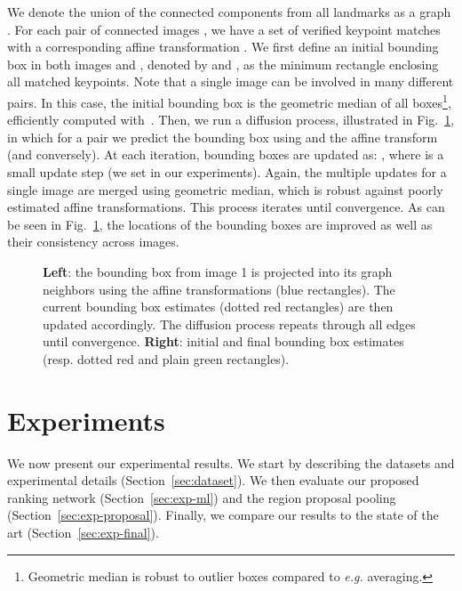 \documentclass[runningheads]{llncs}
\begin{document}
We denote the union of the connected components from all landmarks as a graph .  For each pair of connected images
, we have a set of verified keypoint matches with a corresponding affine
transformation .  We first define an initial bounding box in both images  and , denoted by  and
, as the minimum rectangle enclosing all matched keypoints. Note that a single image can be involved in many
different pairs. In this case, the initial bounding box is the geometric median of all boxes\footnote{Geometric median
is robust to outlier boxes compared to \emph{e.g.} averaging.}, efficiently computed
with~\cite{GeoMedian2004}. Then, we run a diffusion process, illustrated in Fig.~\ref{fig:diffusion}, in which for a
pair  we predict the bounding box  using  and the affine transform  (and conversely).  At
each iteration, bounding boxes are updated as: , where  is a small
update step (we set  in our experiments). Again, the multiple updates for a single image are merged using
geometric median, which is robust against poorly estimated affine transformations.  This process iterates until
convergence. As can be seen in Fig.~\ref{fig:diffusion}, the locations of the bounding boxes are improved as well as 
their consistency across images.


\begin{figure}[t!]
\begin{centering}
\par\end{centering}
\caption{\label{fig:diffusion}\textbf{Left}: the bounding box from image 1 is projected
into its graph neighbors using the affine transformations (blue rectangles). 
The current bounding box estimates (dotted red rectangles) are then updated accordingly.
The diffusion process repeats through all edges until convergence.
\textbf{Right}: initial and final bounding box estimates (resp. dotted red and plain green rectangles).}
\end{figure}


\section{Experiments}
\label{sec:exp}
We now present our experimental results.
We start by describing the datasets and experimental details (Section~\ref{sec:dataset}).
We then evaluate our proposed ranking network (Section~\ref{sec:exp-ml}) and the region proposal pooling (Section~\ref{sec:exp-proposal}).
Finally, we compare our results to the state of the art  (Section~\ref{sec:exp-final}).
\end{document}
